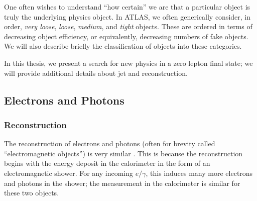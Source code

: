 One often wishes to understand ``how certain'' we are that a particular object is truly the underlying physics object.
In ATLAS, we often generically consider, in order, \textit{very loose}, \textit{loose}, \textit{medium}, and \textit{tight} objects\footnotemark.
These are ordered in terms of decreasing object efficiency, or equivalently, decreasing numbers of fake objects.
We will also describe briefly the classification of objects into these categories.

In this thesis, we present a search for new physics in a zero lepton final state; we will provide additional details about jet and \met reconstruction.


\subsection{Electrons and Photons}

\subsubsection{Reconstruction}
The reconstruction of electrons and photons (often for brevity called ``electromagnetic objects'') is very similar \cite{Aaboud:2016yuq,PERF-2013-05, PERF-2013-03 }.
This is because the reconstruction begins with the energy deposit in the calorimeter in the form of an electromagnetic shower.
For any incoming $e/\gamma$, this induces many more electrons and photons in the shower; the measurement in the calorimeter is similar for these two objects.

